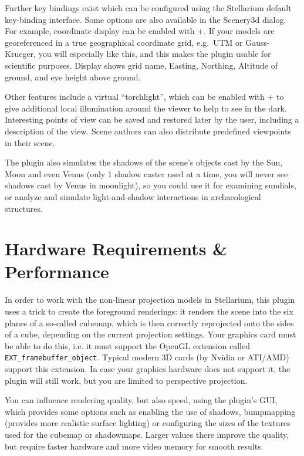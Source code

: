 Further key bindings exist which can be configured using the Stellarium default
key-binding interface. Some options are also available in the Scenery3d dialog.
For example, coordinate display can be enabled with +. If your models are georeferenced
in a true geographical coordinate grid, e.g.\ UTM or Gauss-Krueger, you will
especially like this, and this makes the plugin usable for scientific purposes.
Display shows grid name, Easting, Northing, Altitude of ground, and eye height
above ground.

Other features include a virtual ``torchlight'', which can be enabled with + to give
additional local illumination around the viewer to help to see in the dark.
Interesting points of view can be saved and restored later by the user,
including a description of the view. Scene authors can also distribute
predefined viewpoints in their scene.

The plugin also simulates the shadows of the scene's objects cast by
the Sun, Moon and even Venus (only 1 shadow caster used at a time, you
will never see shadows cast by Venus in moonlight), so you could use
it for examining sundials, or analyze and simulate light-and-shadow
interactions in archaeological structures.

\section{Hardware Requirements \& Performance}
\label{sec:scenery3d:HardwareRequirements}

In order to work with the non-linear projection models in Stellarium,
this plugin uses a trick to create the foreground renderings: it
renders the scene into the six planes of a so-called cubemap, which is
then correctly reprojected onto the sides of a cube, depending on the
current projection settings. Your graphics card must be able to do
this, i.e. it must support the OpenGL extension called
\texttt{EXT\_framebuffer\_object}. Typical modern 3D cards (by Nvidia
or ATI/AMD) support this extension. In case your graphics hardware
does not support it, the plugin will still work, but you are limited
to perspective projection.

You can influence rendering quality, but also speed, using the plugin's 
GUI, which provides some options such as enabling the use
of shadows, bumpmapping (provides more realistic surface lighting) or 
configuring the sizes of the textures used
for the cubemap or shadowmaps. Larger values there improve the quality,
but require faster hardware and more video memory for smooth results.

